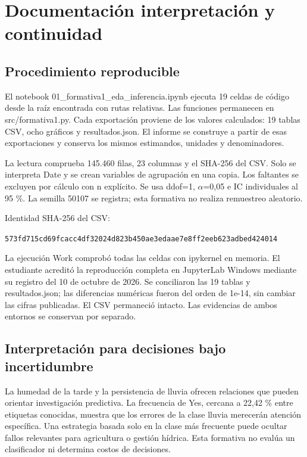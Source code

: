 \documentclass[11pt,a4paper]{article}
\begin{document}
\clearpage


\section{Documentación interpretación y continuidad}

\subsection{Procedimiento reproducible}

El notebook 01\_formativa1\_eda\_inferencia.ipynb ejecuta 19 celdas de código desde la raíz encontrada con rutas relativas. Las funciones permanecen en src/formativa1.py. Cada exportación proviene de los valores calculados: 19 tablas CSV, ocho gráficos y resultados.json. El informe se construye a partir de esas exportaciones y conserva los mismos estimandos, unidades y denominadores.


La lectura comprueba 145.460 filas, 23 columnas y el SHA-256 del CSV. Solo se interpreta Date y se crean variables de agrupación en una copia. Los faltantes se excluyen por cálculo con n explícito. Se usa ddof=1, \(\alpha\)=0,05 e IC individuales al 95 \%. La semilla 50107 se registra; esta formativa no realiza remuestreo aleatorio.


Identidad SHA-256 del CSV:\par
{\footnotesize\texttt{573fd715cd69fcacc4df32024d823b450ae3edaae7e8ff2eeb623adbed424014}\par}

La ejecución Work comprobó todas las celdas con ipykernel en memoria. El estudiante acreditó la reproducción completa en JupyterLab Windows mediante su registro del 10 de octubre de 2026. Se conciliaron las 19 tablas y resultados.json; las diferencias numéricas fueron del orden de 1e-14, sin cambiar las cifras publicadas. El CSV permaneció intacto. Las evidencias de ambos entornos se conservan por separado.


\subsection{Interpretación para decisiones bajo incertidumbre}

La humedad de la tarde y la persistencia de lluvia ofrecen relaciones que pueden orientar investigación predictiva. La frecuencia de Yes, cercana a 22,42 \% entre etiquetas conocidas, muestra que los errores de la clase lluvia merecerán atención específica. Una estrategia basada solo en la clase más frecuente puede ocultar fallos relevantes para agricultura o gestión hídrica. Esta formativa no evalúa un clasificador ni determina costos de decisiones.
\end{document}
